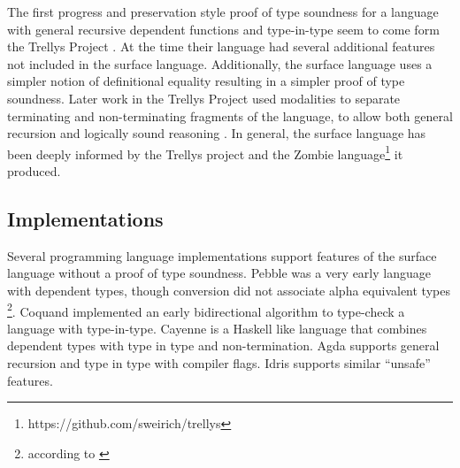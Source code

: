 The first progress and preservation style proof of type soundness
for a language with general recursive dependent functions and type-in-type
seem to come form the Trellys Project \cite{sjoberg2012irrelevance}.
At the time their language had several additional features not included
in the surface language. Additionally, the surface language uses a
simpler notion of definitional equality resulting in a simpler proof
of type soundness. Later work in the Trellys Project\cite{casinghino2014combining,casinghino2014combiningthesis}
used modalities to separate terminating and non-terminating fragments
of the language, to allow both general recursion and logically sound
reasoning%
. In general, the surface language has been deeply informed by the
Trellys project\cite{sjoberg2012irrelevance}\cite{casinghino2014combining,casinghino2014combiningthesis}
\cite{sjoberg2015programming} \cite{sjoberg2015dependently} and
the Zombie language\footnote{https://github.com/sweirich/trellys}
it produced.



\subsection{Implementations}

Several programming language implementations support features of the
surface language without a proof of type soundness. Pebble\cite{10.1007/3-540-13346-1_1}
was a very early language with dependent types, though conversion
did not associate alpha equivalent types
\footnote{according to \cite{Reinhold89typecheckingis}}. Coquand
implemented an early bidirectional algorithm to type-check a language
with type-in-type\cite{COQUAND1996167}. Cayenne \cite{10.1145/289423.289451}
is a Haskell like language that combines dependent types with type
in type and non-termination. Agda supports general recursion and type
in type with compiler flags. Idris supports similar ``unsafe'' features.


